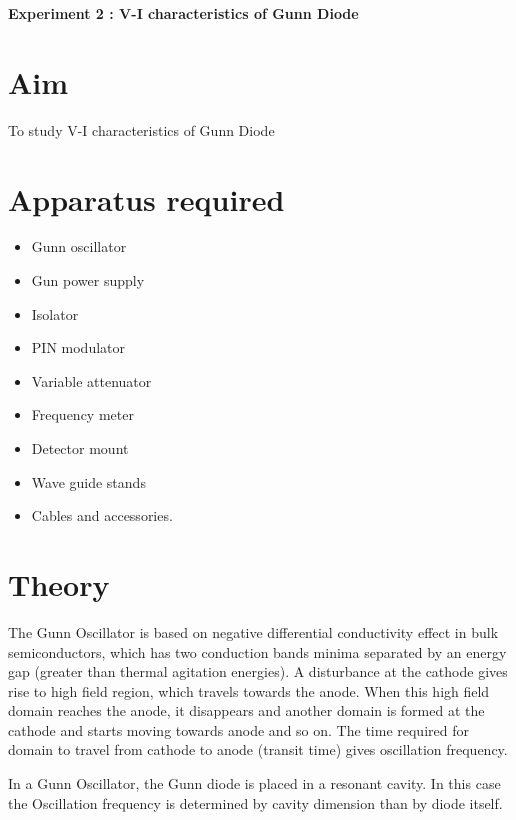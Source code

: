 \documentclass[11pt, a4paper]{article}
\begin{document}
\begin{center}
\fontsize{16}{16}
\selectfont
\textbf{Experiment 2 : V-I characteristics of Gunn Diode}
\end{center}
\selectfont
\section*{Aim}
To study V-I characteristics of Gunn Diode
\section*{Apparatus required}
\begin{minipage}[t]{0.35\linewidth}
	\begin{itemize}
		\item Gunn oscillator
		\item Gun power supply
		\item Isolator
		\item PIN modulator	
		\item Variable attenuator
	\end{itemize}
\end{minipage}
\begin{minipage}[t]{0.45\linewidth}
	\begin{itemize}
		\item Frequency meter
		\item Detector mount
		\item Wave guide stands
		\item Cables and accessories.
	\end{itemize}
\end{minipage}

\section*{Theory}
The Gunn Oscillator is based on negative differential conductivity effect in bulk semiconductors, which has two conduction bands minima separated by an energy gap (greater than thermal agitation energies). A disturbance at the cathode gives rise to high field region, which travels towards the anode. When this high field domain reaches the anode, it disappears and another domain is formed at the cathode and starts moving towards anode and so on. The time required for domain to travel from cathode to anode (transit time) gives oscillation frequency.

In a Gunn Oscillator, the Gunn diode is placed in a resonant cavity. In this case the Oscillation frequency is determined by cavity dimension than by diode itself.
\end{document}
